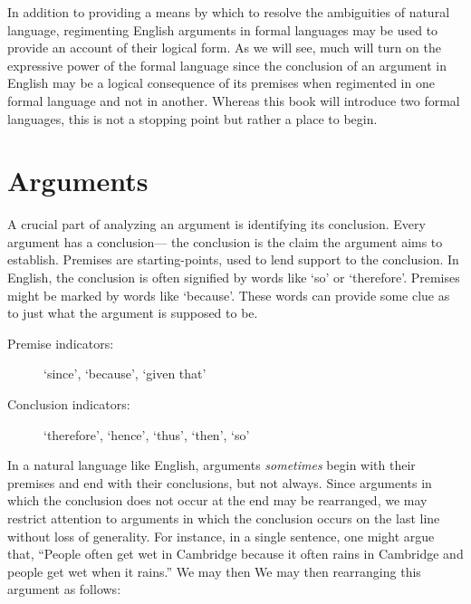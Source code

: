 In addition to providing a means by which to resolve the ambiguities of natural language, regimenting English arguments in formal languages may be used to provide an account of their logical form.
As we will see, much will turn on the expressive power of the formal language since the conclusion of an argument in English may be a logical consequence of its premises when regimented in one formal language and not in another.
Whereas this book will introduce two formal languages, this is not a stopping point but rather a place to begin.






\section{Arguments}

A crucial part of analyzing an argument is identifying its conclusion.
Every argument has a conclusion--- the conclusion is the claim the argument aims to establish.
Premises are starting-points, used to lend support to the conclusion.
In English, the conclusion is often signified by words like `so' or `therefore'.
Premises might be marked by words like `because'.
These words can provide some clue as to just what the argument is supposed to be.

\begin{description}
  \item[Premise indicators:] `since', `because', `given that'
  \item[Conclusion indicators:] `therefore', `hence', `thus', `then', `so'
\end{description}

In a natural language like English, arguments \textit{sometimes} begin with their premises and end with their conclusions, but not always.
Since arguments in which the conclusion does not occur at the end may be rearranged, we may restrict attention to arguments in which the conclusion occurs on the last line without loss of generality.
For instance, in a single sentence, one might argue that, ``People often get wet in Cambridge because it often rains in Cambridge and people get wet when it rains.''
We may then We may then rearranging this argument as follows:

